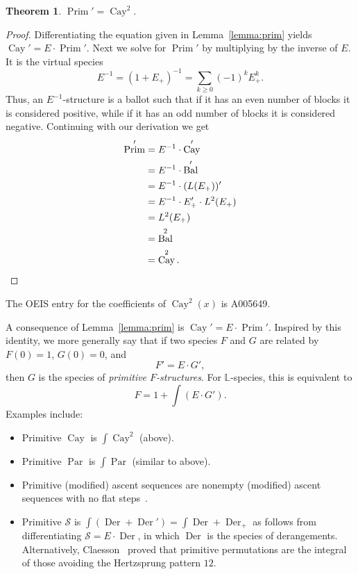\documentclass[a4paper, 11pt]{article}
\DeclareMathOperator{\Bal}{Bal}
\DeclareMathOperator{\Cay}{Cay}
\DeclareMathOperator{\Prim}{Prim}
\DeclareMathOperator{\Par}{Par}
\DeclareMathOperator{\Der}{Der}
\newcommand{\LL}{\mathbb{L}}
\newcommand{\Sym}{\mathcal{S}}
\theoremstyle{definition}
\newtheorem{theorem}{Theorem}[section]
\begin{document}
\begin{theorem}\label{thm:prim-cay}
  $\Prim' = \Cay^2$.
\end{theorem}
\begin{proof}
  Differentiating the equation given in Lemma~\ref{lemma:prim} yields
  $\Cay' = E\cdot \Prim'$. Next we solve for $\Prim'$ by multiplying by
  the inverse of $E$. It is the virtual species
  \[
    E^{-1} = (1+E_+)^{-1} = \sum_{k\geq 0} (-1)^kE_+^k.
  \]
  Thus, an $E^{-1}$-structure is a ballot such that if it has an even
  number of blocks it is considered positive, while if it has an odd
  number of blocks it is considered negative. Continuing with our
  derivation we get
  \begin{align*}
    \Prim'
    &= E^{-1}\cdot \Cay' \\
    &= E^{-1}\cdot \Bal' \\
    &= E^{-1}\cdot (L(E_+))' \\
    &= E^{-1}\cdot E_+'\cdot L^2(E_+) \\
    &= L^2(E_+) \\
    & = \Bal^2\\
    & = \Cay^2. \qedhere
  \end{align*}
\end{proof}

The OEIS entry for the coefficients of $\Cay^2(x)$ is A005649.

A consequence of Lemma~\ref{lemma:prim} is 
$\Cay'=E\cdot \Prim'$. Inspired by this identity, we more generally say
that if two species $F$ and $G$ are related by $F(0)=1$, $G(0)=0$, and
\[
  F' = E\cdot G',
\]
then $G$ is the species of \emph{primitive $F$-structures}. For $\LL$-species, this is equivalent to
\[
F=1+\int (E\cdot G').
\]
Examples include:
\begin{itemize}
\item Primitive $\Cay$ is $\int \Cay^2$ (above).
\item Primitive $\Par$ is $\int \Par$ (similar to above).
\item Primitive (modified) ascent sequences are nonempty (modified) ascent
sequences with no flat steps~\cite{modasc,primitiveascseq}.
\item Primitive $\Sym$ is $\int (\Der + \Der') = \int\Der + \Der_+$ as follows from
differentiating $\Sym=E\cdot \Der$, in which $\Der$ is the species of derangements. 
Alternatively, Claesson~\cite{Cl2022} proved that primitive permutations are
the integral of those avoiding the Hertzsprung pattern $12$.
\end{itemize}
\end{document}
